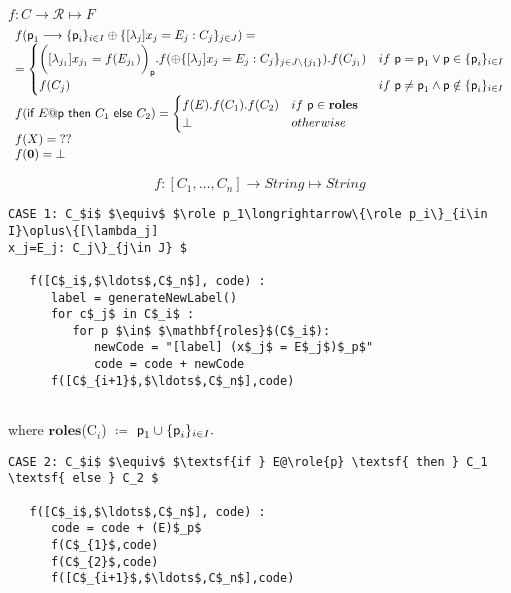$f: C\rightarrow \mathcal R\mapsto F$
\[
\begin{array}{l}
f(\textsf{p}_1\longrightarrow\{\textsf{p}_i\}_{i\in I}\oplus\{[\lambda_j]
x_j=E_j: C_j\}_{j\in J}) = \\
= \begin{cases}
\bigg( [\lambda_{j_1}] x_{j_1} = f(E_{j_1}) \bigg)_{\textsf{p}}. f(\oplus\{[\lambda_j]
x_j=E_j: C_j\}_{j\in J\setminus\{{j_1}\}}). f(C_{j_1}) &if \ \textsf{p} = \textsf{p}_1 \lor \textsf{p} \in \textsf{\{}\textsf{p}_i\}_{i \in I} \\
f(C_j) & if \ \textsf{p} \neq \textsf{p}_1 \land \textsf{p} \notin \{\textsf{p}_i\}_{i\in I}
\end{cases} 
\\
f(\textsf{if } E@\textsf{p} \textsf{ then } C_1 \textsf{ else } C_2) = \begin{cases}
f(E) . f(C_1) . f(C_2) & if\ \textsf{p}\in \mathbf{roles}\\
\bot & otherwise
\end{cases} 
\\
f(X) = \; ??
\\
f(\mathbf{0}) = \bot
\end{array}
\]


\[
f: [C_1,\ldots,C_n] \rightarrow String \mapsto String
\]


\begin{lstlisting}[mathescape=true,backgroundcolor={}]
CASE 1: C_$i$ $\equiv$ $\role p_1\longrightarrow\{\role p_i\}_{i\in I}\oplus\{[\lambda_j]
x_j=E_j: C_j\}_{j\in J} $

   f([C$_i$,$\ldots$,C$_n$], code) :
      label = generateNewLabel()
      for c$_j$ in C$_i$ :
         for p $\in$ $\mathbf{roles}$(C$_i$):
            newCode = "[label] (x$_j$ = E$_j$)$_p$"
            code = code + newCode
      f([C$_{i+1}$,$\ldots$,C$_n$],code)
      
\end{lstlisting}    
where $\mathbf{roles}$(C$_i$) $\coloneqq$ $\textsf{p}_1  \cup \{\textsf{p}_i\}_{i\in I}.$




\begin{lstlisting}[mathescape=true,backgroundcolor={}]
CASE 2: C_$i$ $\equiv$ $\textsf{if } E@\role{p} \textsf{ then } C_1 \textsf{ else } C_2 $

   f([C$_i$,$\ldots$,C$_n$], code) :
      code = code + (E)$_p$
      f(C$_{1}$,code)
      f(C$_{2}$,code)
      f([C$_{i+1}$,$\ldots$,C$_n$],code)
      

      
	
\end{lstlisting}

